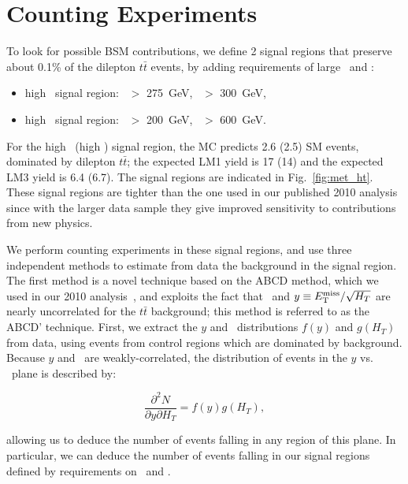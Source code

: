 \section{Counting Experiments}
\label{sec:datadriven}

To look for possible BSM contributions, we define 2 signal regions that preserve about 
0.1\% of the dilepton $t\bar{t}$ events, by adding requirements of large \MET\ and \Ht:

\begin{itemize}
\item high \MET\ signal region: \MET\ $>$ 275~GeV, \Ht\ $>$ 300~GeV,
\item high \Ht\ signal region:  \MET\ $>$ 200~GeV, \Ht\ $>$ 600~GeV.
\end{itemize}

For the high \MET\ (high \Ht) signal region, the MC predicts 2.6 (2.5) SM events, 
dominated by dilepton $t\bar{t}$; the expected LM1 yield is 17 (14) and the
expected LM3 yield is 6.4 (6.7). The signal regions are indicated in Fig.~\ref{fig:met_ht}.
These signal regions are tighter than the one used in our published 2010 analysis since 
with the larger data sample they give improved sensitivity to contributions from new physics.

We perform counting experiments in these signal regions, and use three independent methods to estimate from data the background in the signal region.
The first method is a novel technique based on the ABCD method, which we used in our 2010 analysis~\cite{ref:ospaper}, 
and exploits the fact that \HT\ and $y \equiv E_{\mathrm{T}}^{\text{miss}}/\sqrt{H_T}$ are nearly uncorrelated for the $t\bar{t}$ background;
this method is referred to as the ABCD' technique. First, we extract the $y$ and \Ht\ distributions 
$f(y)$ and $g(H_T)$ from data, using events from control regions which are dominated by background. 
Because $y$ and \Ht\ are weakly-correlated, the distribution of events in the $y$ vs. \Ht\ plane is described by:

\begin{equation}
\label{eq:abcdprime}
\frac{\partial^2 N}{\partial y \partial H_T} = f(y)g(H_T),
\end{equation}

allowing us to deduce the number of events falling in any region of this plane. In particular,
we can deduce the number of events falling in our signal regions defined by requirements on \MET\ and \Ht.

